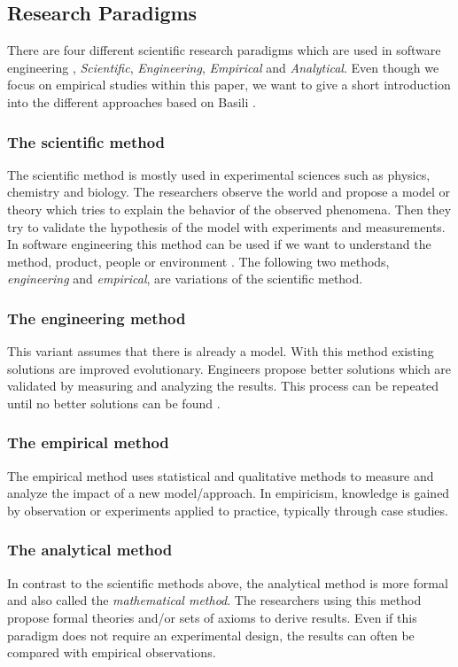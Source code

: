 \documentclass[runningheads]{llncs}
\begin{document}
\subsection{Research Paradigms}
There are four different scientific research paradigms which are used in software engineering \cite{10-1007-3-540-57092-6-91,Glass:1994:SC:624604.625401}, \textit{Scientific}, \textit{Engineering}, \textit{Empirical} and \textit{Analytical}. Even though we focus on empirical studies within this paper, we want to give a short introduction into the different approaches based on Basili \cite{10-1007-3-540-57092-6-91}.

\subsubsection{The scientific method}
The scientific method is mostly used in experimental sciences such as physics, chemistry and biology. The researchers observe the world and propose a model or theory which tries to explain the behavior of the observed phenomena. Then they try to validate the hypothesis of the model with experiments and measurements. In software engineering this method can be used if we want to understand the method, product, people or environment \cite{10-1007-3-540-57092-6-91}. The following two methods, \textit{engineering} and \textit{empirical}, are variations of the scientific method.

\subsubsection{The engineering method} 
This variant assumes that there is already a model. With this method existing solutions are improved evolutionary. Engineers propose better solutions which are validated by measuring and analyzing the results. This process can be repeated until no better solutions can be found \cite{10-1007-3-540-57092-6-91}. 

\subsubsection{The empirical method}
The empirical method uses statistical and qualitative methods to measure and analyze the impact of a new model/approach. In empiricism, knowledge is gained by observation or experiments \cite{goodwin2009research} applied to practice, typically through case studies.

\subsubsection{The analytical method}
In contrast to the scientific methods above, the analytical method is more formal and also called the \textit{mathematical method}. The researchers using this method propose formal theories and/or sets of axioms \cite{10-1007-3-540-57092-6-91} to derive results. Even if this paradigm does not require an experimental design, the results can often be compared with empirical observations.
\end{document}
